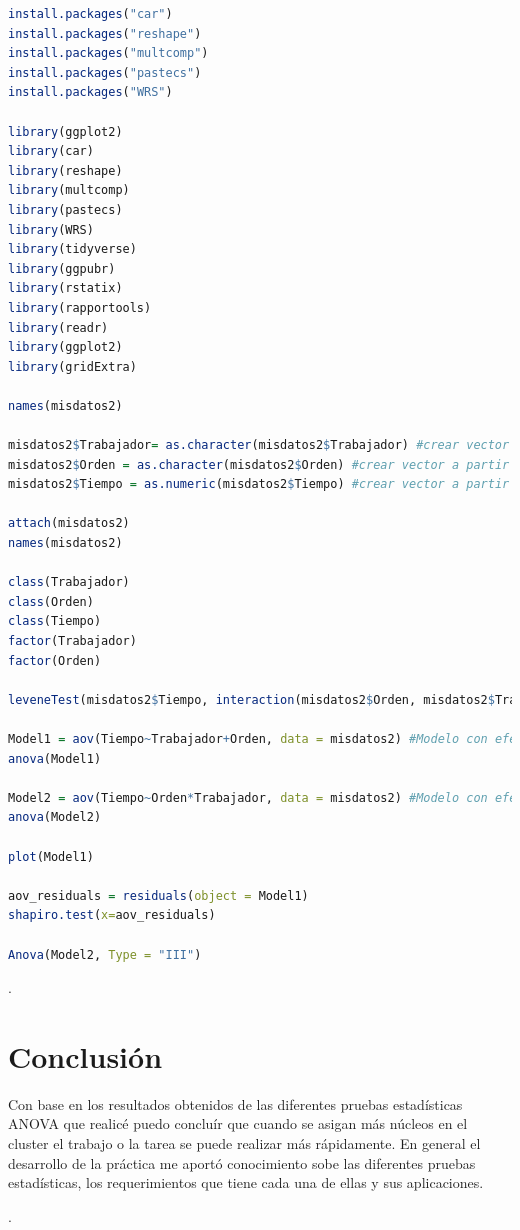 \documentclass{article}
\begin{document}
\lstset{style=mystyle}
\begin{lstlisting}[language=R, caption= Código para prueba estadística ANOVA de dos vías.]
install.packages("car")
install.packages("reshape")
install.packages("multcomp")
install.packages("pastecs")
install.packages("WRS")

library(ggplot2)
library(car)
library(reshape)
library(multcomp)
library(pastecs)
library(WRS)
library(tidyverse)
library(ggpubr)
library(rstatix)
library(rapportools)
library(readr)
library(ggplot2)
library(gridExtra)

names(misdatos2)

misdatos2$Trabajador= as.character(misdatos2$Trabajador) #crear vector a partir del dataframe
misdatos2$Orden = as.character(misdatos2$Orden) #crear vector a partir del dataframe
misdatos2$Tiempo = as.numeric(misdatos2$Tiempo) #crear vector a partir del dataframe

attach(misdatos2)
names(misdatos2)

class(Trabajador)
class(Orden)
class(Tiempo)
factor(Trabajador)
factor(Orden)

leveneTest(misdatos2$Tiempo, interaction(misdatos2$Orden, misdatos2$Trabajador), center = median)

Model1 = aov(Tiempo~Trabajador+Orden, data = misdatos2) #Modelo con efectos principales
anova(Model1)

Model2 = aov(Tiempo~Orden*Trabajador, data = misdatos2) #Modelo con efectos principales con interacción
anova(Model2)

plot(Model1)

aov_residuals = residuals(object = Model1)
shapiro.test(x=aov_residuals)

Anova(Model2, Type = "III")


\end{lstlisting}

\newpage
.
\bigskip

\section{Conclusi\'{o}n}
Con base en los resultados obtenidos de las diferentes pruebas estadísticas ANOVA que realicé puedo concluír que cuando se asigan más núcleos en el cluster el trabajo o la tarea se puede realizar más rápidamente. En general el desarrollo de la práctica me aportó conocimiento sobe las diferentes pruebas estadísticas, los requerimientos que tiene cada una de ellas y sus aplicaciones. 

\newpage
.
\bigskip
\bigskip




\end{document}
